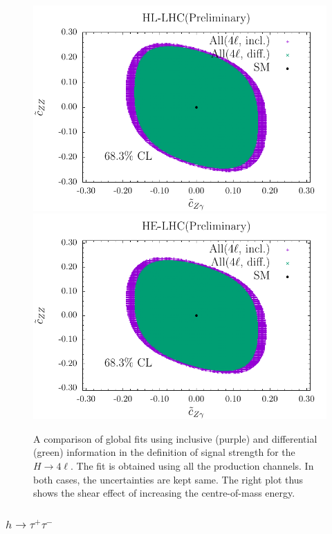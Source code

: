 \documentclass[../report.tex]{subfiles}
\begin{document}
\begin{figure}
\centering
 \includegraphics[scale=0.5]{tCza-tCzz-4l-all-HL}
 \includegraphics[scale=0.5]{tCza-tCzz-4l-all-HE}
 \caption{A comparison of global fits using inclusive (purple) and differential (green) information in the
 definition of signal strength for the $H \to 4\ell$. The fit is obtained using all the production channels.
 In both cases, the uncertainties are kept same. The right plot thus shows the shear effect
 of increasing the centre-of-mass energy.}
\end{figure}



\subsubsection{$h \to \tau^+ \tau^-$}
\end{document}
